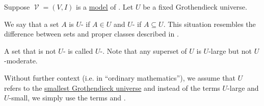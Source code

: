 \begin{definition}\label{def:large_and_small_sets}
  Suppose \( \mscrV = (V, I) \) is a \hyperref[def:first_order_semantics/satisfiability]{model} of . Let \( U \) be a fixed Grothendieck universe.

  We say that a set \( A \) is \( U \)- if \( A \in U \) and \( U \)- if \( A \subseteq U \). This situation resembles the difference between sets and proper classes described in .

  A set that is not \( U \)- is called \( U \)-. Note that any superset of \( U \) is \( U \)-large but not \( U \)-moderate.

  Without further context (i.e. in \enquote{ordinary mathematics}), we assume that \( U \) refers to the \hyperref[thm:smallest_grothendieck_universe_existence]{smallest Grothendieck universe} and instead of the terms \( U \)-large and \( U \)-small, we simply use the terms  and .
\end{definition}

